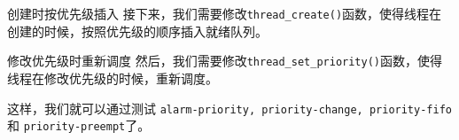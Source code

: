 \documentclass{beamer}
\begin{document}
\begin{frame}

  \begin{block}{创建时按优先级插入}
    接下来，我们需要修改\texttt{thread\_create()}函数，使得线程在创建的时候，按照优先级的顺序插入就绪队列。
  \end{block}

    
    
    
    
    
    
    
    
    


  \begin{block}{修改优先级时重新调度}
    然后，我们需要修改\texttt{thread\_set\_priority()}函数，使得线程在修改优先级的时候，重新调度。
  \end{block}

  \framebreak

  这样，我们就可以通过测试 \texttt{alarm-priority, priority-change, priority-fifo}和 \texttt{priority-preempt}了。

\end{frame}
\end{document}
